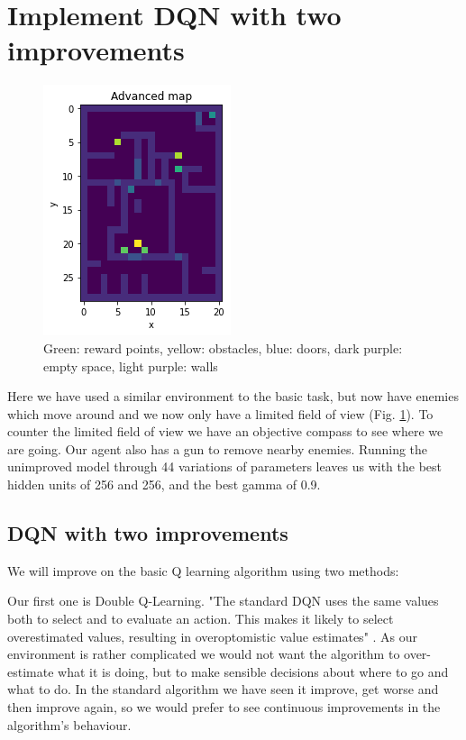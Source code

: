 \documentclass[a4pape, 11pt, english]{article}
\begin{document}
\section{Implement DQN with two improvements}
\begin{figure}[h!]
	\begin{center}
		\includegraphics{img/advanced_map.png}
		\caption{Green: reward points, yellow: obstacles, blue: doors, dark purple: empty space, light purple: walls}
		\label{fig:advanced_map}
	\end{center}
\end{figure}

Here we have used a similar environment to the basic task, but now have enemies which move around and we now only have a limited field of view (Fig. \ref{fig:advanced_map}). To counter the limited field of view we have an objective compass to see where we are going. Our agent also has a gun to remove nearby enemies. Running the unimproved model through 44 variations of parameters leaves us with the best hidden units of 256 and 256, and the best gamma of 0.9.

\subsection{DQN with two improvements}
We will improve on the basic Q learning algorithm using two methods:

Our first one is Double Q-Learning. "The standard DQN uses the same values both to select and to evaluate an action. This makes it likely to select overestimated values, resulting in overoptomistic value estimates" \citep[p. 2]{van_hasselt_deep_2016}. As our environment is rather complicated we would not want the algorithm to over-estimate what it is doing, but to make sensible decisions about where to go and what to do. In the standard algorithm we have seen it improve, get worse and then improve again, so we would prefer to see continuous improvements in the algorithm's behaviour.
\end{document}
